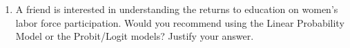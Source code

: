 \documentclass{article}
\begin{document}
\begin{enumerate}
{}\\[1em]


\newpage
\item A friend is interested in understanding the returns to education on women's labor force participation. Would you recommend using the Linear Probability Model or the Probit/Logit models? Justify your answer. \\[1em]
\\[1em]


\end{enumerate}
\end{document}
